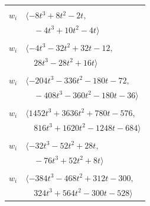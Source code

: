 \documentclass[11pt]{article}
\begin{document}
\begin{longtable}{@{}ll@{}}
\addlinespace[2pt]
\multicolumn{2}{@{}p{0.97\textwidth}@{}}{$i=5$, $D_i=2$, $\rho_{ij}$: $6{:}2, \allowbreak 28{:}1, \allowbreak 33{:}2, \allowbreak 40{:}1, \allowbreak 43{:}2, \allowbreak 48{:}1, \allowbreak 49{:}1, \allowbreak 58{:}1$}\\
$w_i$ & $\langle -8t^{3}+8t^{2}-2t,$\\
 & $\quad -4t^{3}+10t^{2}-4t\rangle$\\
\addlinespace[2pt]
\multicolumn{2}{@{}p{0.97\textwidth}@{}}{$i=6$, $D_i=4$, $\rho_{ij}$: $4{:}1, \allowbreak 5{:}1, \allowbreak 8{:}1, \allowbreak 24{:}1, \allowbreak 29{:}2, \allowbreak 45{:}1, \allowbreak 48{:}1, \allowbreak 56{:}2$}\\
$w_i$ & $\langle -4t^{3}-32t^{2}+32t-12,$\\
 & $\quad 28t^{3}-28t^{2}+16t\rangle$\\
\addlinespace[2pt]
\multicolumn{2}{@{}p{0.97\textwidth}@{}}{$i=7$, $D_i=16$, $\rho_{ij}$: $4{:}2, \allowbreak 9{:}2, \allowbreak 14{:}2, \allowbreak 32{:}2, \allowbreak 38{:}2, \allowbreak 43{:}2$}\\
$w_i$ & $\langle -204t^{3}-336t^{2}-180t-72,$\\
 & $\quad -408t^{3}-360t^{2}-180t-36\rangle$\\
\addlinespace[2pt]
\multicolumn{2}{@{}p{0.97\textwidth}@{}}{$i=8$, $D_i=32$, $\rho_{ij}$: $0{:}2, \allowbreak 1{:}2, \allowbreak 6{:}2, \allowbreak 9{:}2, \allowbreak 15{:}1, \allowbreak 29{:}1, \allowbreak 35{:}2, \allowbreak 43{:}1, \allowbreak 57{:}1$}\\
$w_i$ & $\langle 1452t^{3}+3636t^{2}+780t-576,$\\
 & $\quad 816t^{3}+1620t^{2}-1248t-684\rangle$\\
\addlinespace[2pt]
\multicolumn{2}{@{}p{0.97\textwidth}@{}}{$i=9$, $D_i=4$, $\rho_{ij}$: $7{:}1, \allowbreak 8{:}1, \allowbreak 10{:}2, \allowbreak 16{:}1, \allowbreak 21{:}1, \allowbreak 28{:}2, \allowbreak 63{:}1$}\\
$w_i$ & $\langle -32t^{3}-52t^{2}+28t,$\\
 & $\quad -76t^{3}+52t^{2}+8t\rangle$\\
\addlinespace[2pt]
\multicolumn{2}{@{}p{0.97\textwidth}@{}}{$i=10$, $D_i=64$, $\rho_{ij}$: $2{:}2, \allowbreak 9{:}1, \allowbreak 14{:}2, \allowbreak 15{:}1, \allowbreak 25{:}1, \allowbreak 26{:}1, \allowbreak 44{:}2, \allowbreak 45{:}2, \allowbreak 56{:}2$}\\
$w_i$ & $\langle -384t^{3}-468t^{2}+312t-300,$\\
 & $\quad 324t^{3}+564t^{2}-300t-528\rangle$\\

\end{longtable}
\end{document}
